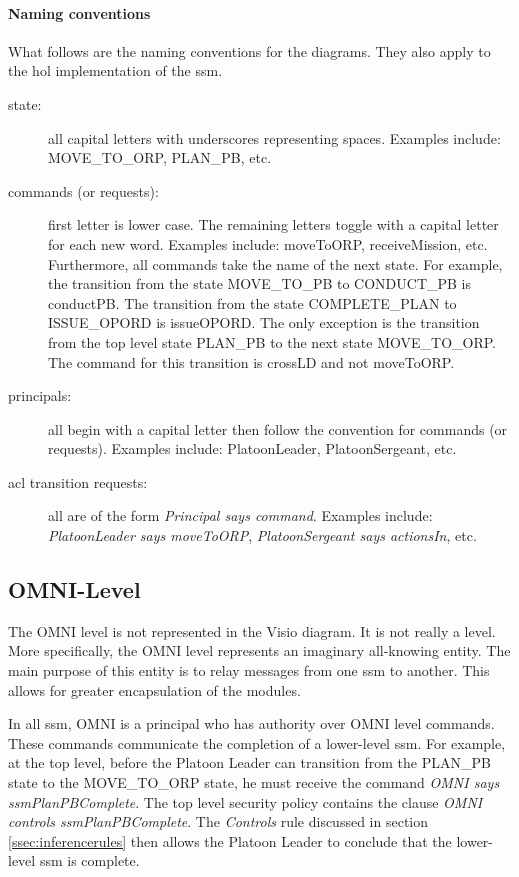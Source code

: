 \documentclass[../../main/main.tex]{subfiles}
\begin{document}
\paragraph*{Naming conventions}
What follows are the naming conventions for the diagrams.  They also apply to the \gls{hol} implementation of the \gls{ssm}.
\begin{description}
\item[state: ] all capital letters with underscores representing spaces.  Examples include: MOVE_TO_ORP, PLAN_PB, etc.
\item[commands (or requests):] first letter is lower case.  The remaining letters toggle with a capital letter for each new word.  Examples include: moveToORP,  receiveMission, etc.  Furthermore, all commands take the name of the next state. For example, the transition from the state MOVE_TO_PB to CONDUCT_PB is conductPB.  The transition from the state COMPLETE_PLAN to ISSUE_OPORD is issueOPORD.  The only exception is the transition from the top level state PLAN_PB to the next state MOVE_TO_ORP.  The command for this transition is crossLD and not moveToORP.
\item[principals:] all begin with a capital letter then follow the convention for commands (or requests).  Examples include: PlatoonLeader, PlatoonSergeant, etc.
\item [\gls{acl} transition requests:] all are of the form \textit{Principal says command}.  Examples include: \textit{PlatoonLeader says moveToORP}, \textit{PlatoonSergeant says actionsIn}, etc.
\end{description}

\subsection{OMNI-Level}\label{ssec:omnilevel}
The OMNI level is not represented in the Visio diagram.  It is not really a level.  More specifically, the OMNI level represents an imaginary all-knowing entity.  The main purpose of this entity is to relay messages from one \gls{ssm} to another.  This allows for greater encapsulation of the modules. 

In all \gls{ssm}, OMNI is a principal who has authority over OMNI level commands.  These commands communicate the completion of a lower-level \gls{ssm}.  For example, at the top level, before the Platoon Leader can transition from the PLAN_PB state to the MOVE_TO_ORP state, he must receive the command \textit{OMNI says ssmPlanPBComplete}.  The top level security policy contains the clause \textit{OMNI controls ssmPlanPBComplete}.  The \textit{Controls} rule discussed in section \ref{ssec:inferencerules} then allows the Platoon Leader to conclude that the lower-level \gls{ssm} is complete.  
\clearpage
\end{document}
